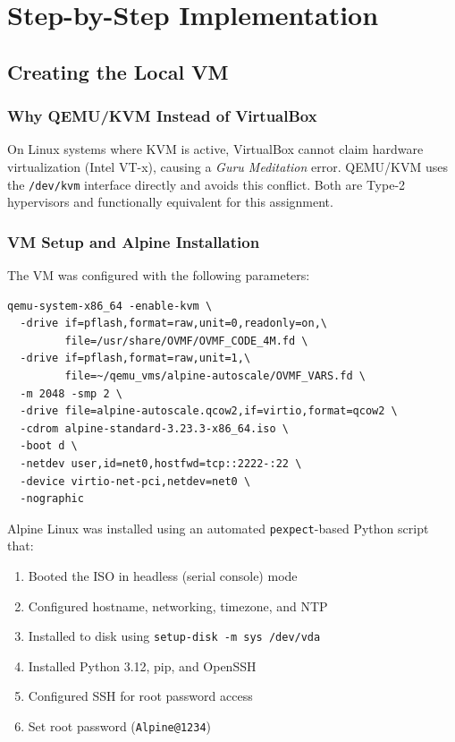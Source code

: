 \documentclass[12pt,a4paper]{article}
\begin{document}
\section{Step-by-Step Implementation}

\subsection{Creating the Local VM}

\subsubsection{Why QEMU/KVM Instead of VirtualBox}

On Linux systems where KVM is active, VirtualBox cannot claim hardware virtualization (Intel VT-x),
causing a \textit{Guru Meditation} error. QEMU/KVM uses the \texttt{/dev/kvm} interface directly
and avoids this conflict. Both are Type-2 hypervisors and functionally equivalent for this assignment.

\subsubsection{VM Setup and Alpine Installation}

The VM was configured with the following parameters:

\begin{lstlisting}[style=bashstyle, caption={QEMU VM Launch Command}]
qemu-system-x86_64 -enable-kvm \
  -drive if=pflash,format=raw,unit=0,readonly=on,\
         file=/usr/share/OVMF/OVMF_CODE_4M.fd \
  -drive if=pflash,format=raw,unit=1,\
         file=~/qemu_vms/alpine-autoscale/OVMF_VARS.fd \
  -m 2048 -smp 2 \
  -drive file=alpine-autoscale.qcow2,if=virtio,format=qcow2 \
  -cdrom alpine-standard-3.23.3-x86_64.iso \
  -boot d \
  -netdev user,id=net0,hostfwd=tcp::2222-:22 \
  -device virtio-net-pci,netdev=net0 \
  -nographic
\end{lstlisting}

Alpine Linux was installed using an automated \texttt{pexpect}-based Python script that:
\begin{enumerate}
    \item Booted the ISO in headless (serial console) mode
    \item Configured hostname, networking, timezone, and NTP
    \item Installed to disk using \texttt{setup-disk -m sys /dev/vda}
    \item Installed Python 3.12, pip, and OpenSSH
    \item Configured SSH for root password access
    \item Set root password (\texttt{Alpine@1234})
\end{enumerate}
\end{document}
